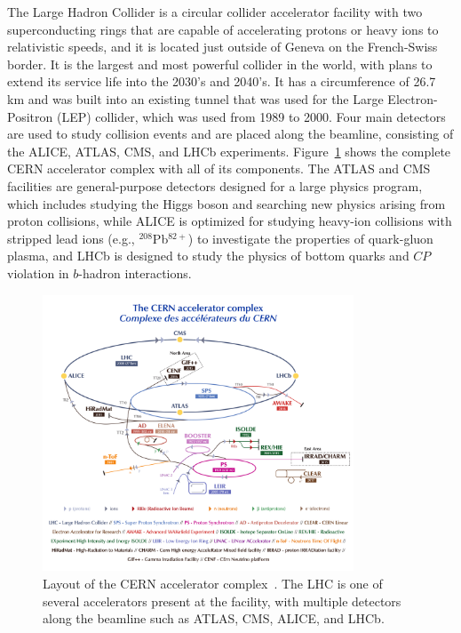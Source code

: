The Large Hadron Collider is a circular collider accelerator facility with two superconducting rings that are capable of accelerating protons or heavy ions to relativistic speeds, and it is located just outside of Geneva on the French-Swiss border.
It is the largest and most powerful collider in the world, with plans to extend its service life into the 2030's and 2040's.
It has a circumference of 26.7 km and was built into an existing tunnel that was used for the Large Electron-Positron (LEP) collider, which was used from 1989 to 2000.
Four main detectors are used to study collision events and are placed along the beamline, consisting of the ALICE, ATLAS, CMS, and LHCb experiments.
Figure~\ref{fig:CERN} shows the complete CERN accelerator complex with all of its components.
The ATLAS and CMS facilities are general-purpose detectors designed for a large physics program, which includes studying the Higgs boson and searching new physics arising from proton collisions, while ALICE is optimized for studying heavy-ion collisions with stripped lead ions (e.g., $^{208}$Pb$^{82+}$) to investigate the properties of quark-gluon plasma, and LHCb is designed to study the physics of bottom quarks and $CP$ violation in $b$-hadron interactions.

\begin{figure}[htbp]
  \centering
  \includegraphics[width=0.825\textwidth]{fig/experiment/CCC-v2018-print-v2.pdf}
  \caption[
    Layout of the CERN accelerator complex.
    The LHC is one of several accelerators present at the facility, with multiple detectors along the beamline such as ATLAS, CMS, ALICE, and LHCb.
  ]{
    Layout of the CERN accelerator complex~\cite{Mobs:2636343}.
    The LHC is one of several accelerators present at the facility, with multiple detectors along the beamline such as ATLAS, CMS, ALICE, and LHCb.
  }
  \label{fig:CERN}
\end{figure}

